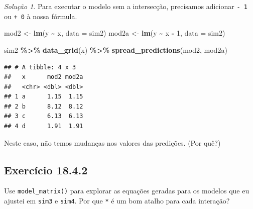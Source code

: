 \documentclass[
]{latex/krantz}
\newenvironment{Shaded}{\begin{snugshade}}{\end{snugshade}}
\newcommand{\AttributeTok}[1]{\textcolor[rgb]{0.13,0.29,0.53}{#1}}
\newcommand{\DecValTok}[1]{\textcolor[rgb]{0.00,0.00,0.81}{#1}}
\newcommand{\FunctionTok}[1]{\textcolor[rgb]{0.13,0.29,0.53}{\textbf{#1}}}
\newcommand{\NormalTok}[1]{#1}
\newcommand{\OtherTok}[1]{\textcolor[rgb]{0.56,0.35,0.01}{#1}}
\newcommand{\SpecialCharTok}[1]{\textcolor[rgb]{0.81,0.36,0.00}{\textbf{#1}}}
\theoremstyle{definition}
\theoremstyle{definition}
\theoremstyle{definition}
\theoremstyle{definition}
\theoremstyle{remark}
\newtheorem*{solution}{Solução}
\begin{document}
\begin{solution}
Para executar o modelo sem a intersecção, precisamos adicionar \texttt{-\ 1} ou \texttt{+\ 0} à nossa fórmula.

\begin{Shaded}
\begin{Highlighting}[]
\NormalTok{mod2 }\OtherTok{\textless{}{-}} \FunctionTok{lm}\NormalTok{(y }\SpecialCharTok{\textasciitilde{}}\NormalTok{ x, }\AttributeTok{data =}\NormalTok{ sim2)}
\NormalTok{mod2a }\OtherTok{\textless{}{-}} \FunctionTok{lm}\NormalTok{(y }\SpecialCharTok{\textasciitilde{}}\NormalTok{ x }\SpecialCharTok{{-}} \DecValTok{1}\NormalTok{, }\AttributeTok{data =}\NormalTok{ sim2)}

\NormalTok{sim2 }\SpecialCharTok{\%\textgreater{}\%}
  \FunctionTok{data\_grid}\NormalTok{(x) }\SpecialCharTok{\%\textgreater{}\%}
  \FunctionTok{spread\_predictions}\NormalTok{(mod2, mod2a)}
\end{Highlighting}
\end{Shaded}

\begin{verbatim}
## # A tibble: 4 x 3
##   x      mod2 mod2a
##   <chr> <dbl> <dbl>
## 1 a      1.15  1.15
## 2 b      8.12  8.12
## 3 c      6.13  6.13
## 4 d      1.91  1.91
\end{verbatim}

Neste caso, não temos mudanças nos valores das predições. (Por quê?)
\end{solution}

\hypertarget{exr18-4-2}{%
\subsection*{Exercício 18.4.2}\label{exr18-4-2}}

Use \texttt{model\_matrix()} para explorar as equações geradas para os modelos que eu ajustei em \texttt{sim3} e \texttt{sim4}. Por que \texttt{*} é um bom atalho para cada interação?
\end{document}
